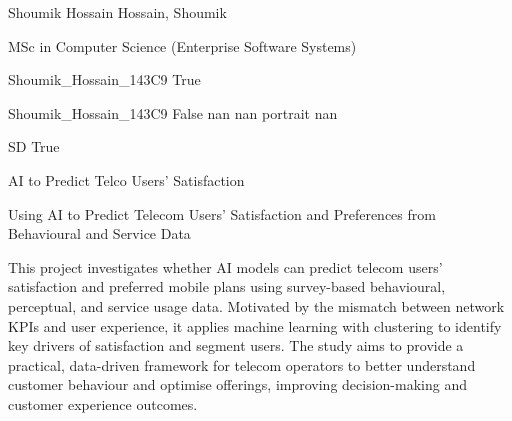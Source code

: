 
\begingroup{}\relax



\def\Key{Shoumik_Hossain_143C9}

{Shoumik Hossain}
{Hossain, Shoumik}

{MSc in Computer Science (Enterprise Software Systems)}

{Shoumik_Hossain_143C9}
{True}

{Shoumik_Hossain_143C9}
{False}
{nan}
{nan}
{portrait}
{nan}

{SD}
{True}

{AI to Predict Telco Users' Satisfaction}

{Using AI to Predict Telecom Users' Satisfaction and Preferences from Behavioural and Service Data}

{This project investigates whether AI models can predict telecom users' satisfaction and preferred mobile plans using survey-based behavioural, perceptual, and service usage data. Motivated by the mismatch between network KPIs and user experience, it applies machine learning with clustering to identify key drivers of satisfaction and segment users. The study aims to provide a practical, data-driven framework for telecom operators to better understand customer behaviour and optimise offerings, improving decision-making and customer experience outcomes.}

